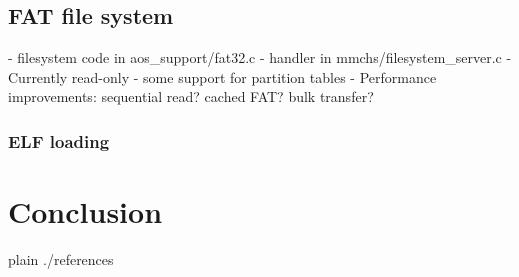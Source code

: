 \documentclass[a4paper,10pt]{article}
\begin{document}
\todo {}

\subsection{FAT file system}
- filesystem code in aos\_support/fat32.c
- handler in mmchs/filesystem\_server.c
- Currently read-only
- some support for partition tables
- Performance improvements: sequential read? cached FAT? bulk transfer?

\subsubsection{ ELF loading}


\section{Conclusion}

\begin{flushleft}
{{{
 {plain}
 {./references}
}}}
\end{flushleft}


\todos
\end{document}
